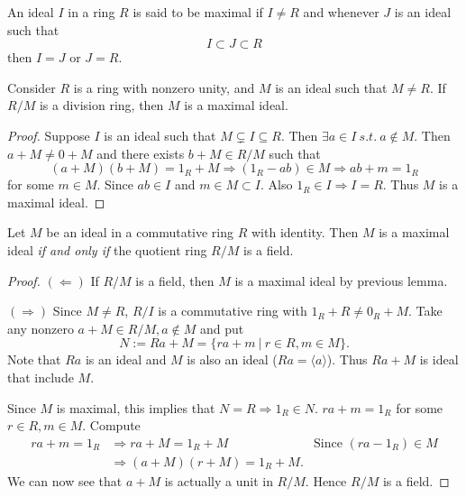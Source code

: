 \begin{definition}
    An ideal $I$ in a ring $R$ is said to be maximal if $I \neq R$ and whenever $J$ is an ideal such that
    \[
        I \subset J \subset R
    \]
    then $I = J$ or $J = R$.
\end{definition}

\begin{lemma}
    Consider $R$ is a ring with nonzero unity, and $M$ is an ideal such that $M \neq R$. If $R/M$ is a 
    division ring, then $M$ is a maximal ideal.
\end{lemma}
\begin{proof}
    Suppose $I$ is an ideal such that $M \subsetneq I \subseteq R$. Then $\exists a \in I \> s.t. \> a \notin M$. 
    Then $a + M \neq 0 + M$ and there exists $b + M \in R/M$ such that 
    \[
        (a+M)(b+M) = 1_R + M \Longrightarrow (1_R - ab) \in M \Longrightarrow ab+m = 1_R
    \]
    for some $m \in M$. Since $ab \in I$ and $m \in M \subset I$. Also $1_R \in I \Longrightarrow I = R$. Thus $M$ is 
    a maximal ideal.
\end{proof}

\begin{theorem}
    Let $M$ be an ideal in a commutative ring $R$ with identity. Then $M$ is a maximal ideal \textit{if and only if}
    the quotient ring $R/M$ is a field. 
\end{theorem}
\begin{proof}
    $(\Leftarrow)$ If $R/M$ is a field, then $M$ is a maximal ideal by previous lemma.

    $(\Rightarrow)$ Since $M \neq R$, $R/I$ is a commutative ring with 
    $1_R + R \neq 0_R + M$. Take any nonzero $a + M \in R/M, a \notin M$ and put 
    \[
        N := Ra + M = \{ ra+m \> | \> r \in R, m \in M \}.
    \]
    Note that $Ra$ is an ideal and $M$ is also an ideal ($Ra = \langle a \rangle$). 
    Thus $Ra + M$ is ideal that include $M$.

    Since $M$ is maximal, this implies that $N = R \Longrightarrow 1_R \in N$. 
    $ra + m = 1_R$ for some $r \in R, m \in M$. Compute 
    \begin{align*}
        ra + m = 1_R &\Rightarrow ra + M = 1_R + M & \text{Since } (ra-1_R) \in M\\
        &\Rightarrow (a+M)(r+M) = 1_R + M.
    \end{align*}
    We can now see that $a+M$ is actually a unit in $R/M$. Hence $R/M$ is a field.
\end{proof}

